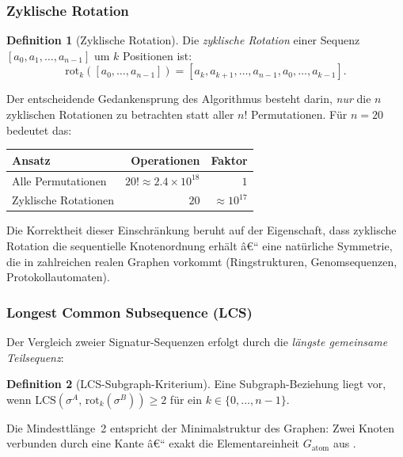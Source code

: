 ﻿\documentclass[12pt,a4paper,twoside]{article}
\theoremstyle{definition}
\newtheorem{definition}{Definition}[section]
\theoremstyle{plain}
\theoremstyle{remark}
\begin{document}
\subsubsection{Zyklische Rotation}

\begin{definition}[Zyklische Rotation]
Die \emph{zyklische Rotation} einer Sequenz
$[a_0, a_1, \ldots, a_{n-1}]$ um $k$ Positionen ist:
\[
  \mathrm{rot}_k([a_0, \ldots, a_{n-1}])
  = [a_k, a_{k+1}, \ldots, a_{n-1}, a_0, \ldots, a_{k-1}].
\]
\end{definition}

Der entscheidende Gedankensprung des Algorithmus besteht darin,
\emph{nur} die $n$ zyklischen Rotationen zu betrachten statt aller
$n!$ Permutationen.  Für $n = 20$ bedeutet das:

\begin{center}
\begin{tabular}{lrr}
  \toprule
  Ansatz & Operationen & Faktor \\
  \midrule
  Alle Permutationen & $20! \approx 2.4 \times 10^{18}$ & $1$ \\
  Zyklische Rotationen & $20$ & $\approx 10^{17}$ \\
  \bottomrule
\end{tabular}
\end{center}

\noindent
Die Korrektheit dieser Einschränkung beruht auf der Eigenschaft,
dass zyklische Rotation die sequentielle Knotenordnung erhält â€“
eine natürliche Symmetrie, die in zahlreichen realen Graphen
vorkommt (Ringstrukturen, Genomsequenzen, Protokollautomaten).

\subsubsection{Longest Common Subsequence (LCS)}

Der Vergleich zweier Signatur-Sequenzen erfolgt durch die
\emph{längste gemeinsame Teilsequenz}:

\begin{definition}[LCS-Subgraph-Kriterium]
Eine Subgraph-Beziehung liegt vor, wenn
$\mathrm{LCS}(\sigma^A,\, \mathrm{rot}_k(\sigma^B)) \geq 2$
für ein $k \in \{0,\ldots,n{-}1\}$.
\end{definition}

Die Mindesttlänge~2 entspricht der Minimalstruktur des Graphen:
Zwei Knoten verbunden durch eine Kante â€“ exakt die Elementareinheit
$G_{\text{atom}}$ aus .
\end{document}

